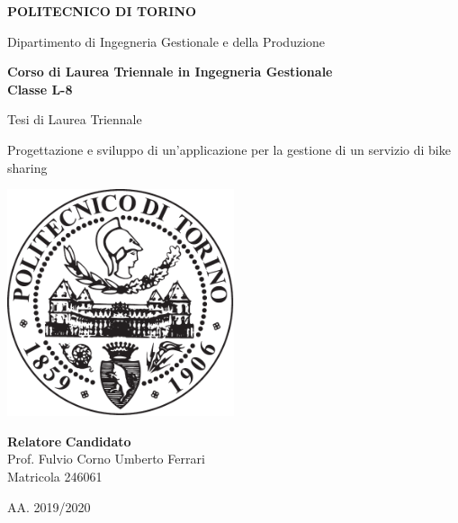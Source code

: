 \begin{titlepage}
\begin{center}
\begin{huge}
\textbf{POLITECNICO DI TORINO}
\end{huge}

\vspace{0.5cm}

{\large Dipartimento di Ingegneria Gestionale e della Produzione}

\vspace{1cm}
\textbf{Corso di Laurea Triennale in Ingegneria Gestionale\\Classe L-8}
\vspace{1.5cm}
 
{\LARGE Tesi di Laurea Triennale\\}
 	
\vspace{1cm}

{\Large Progettazione e sviluppo di un'applicazione per la gestione di un servizio di bike sharing}

\vspace{1cm}
\includegraphics[width=0.5\textwidth]{resources/images/LogoPoliTO.pdf}
\vspace{1cm}
\end{center}
\textbf{Relatore} \hfill \textbf{Candidato}\\
Prof. Fulvio Corno \hfill Umberto Ferrari\\
\text{} \hfill Matricola 246061
\vfill

\begin{center}
{\large AA. 2019/2020}
\end{center}

\end{titlepage}